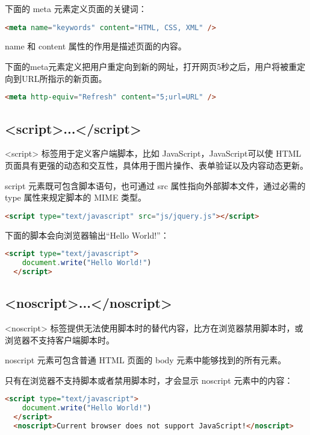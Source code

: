 下面的 meta 元素定义页面的关键词：

\begin{lstlisting}[language=HTML]
  <meta name="keywords" content="HTML, CSS, XML" />
\end{lstlisting}

name 和 content 属性的作用是描述页面的内容。

下面的meta元素定义把用户重定向到新的网址，打开网页5秒之后，用户将被重定向到URL所指示的新页面。

\begin{lstlisting}[language=HTML]
  <meta http-equiv="Refresh" content="5;url=URL" />
\end{lstlisting}


\subsection{<script>...</script>}

<script> 标签用于定义客户端脚本，比如 JavaScript，JavaScript可以使 HTML 页面具有更强的动态和交互性，具体用于图片操作、表单验证以及内容动态更新。

script 元素既可包含脚本语句，也可通过 src 属性指向外部脚本文件，通过必需的 type 属性来规定脚本的 MIME 类型。


\begin{lstlisting}[language=HTML]
  <script type="text/javascript" src="js/jquery.js"></script>
\end{lstlisting}

下面的脚本会向浏览器输出“Hello World!”：

\begin{lstlisting}[language=HTML]
  <script type="text/javascript">
    document.write("Hello World!")
  </script>
\end{lstlisting}

\subsection{<noscript>...</noscript>}

<noscript> 标签提供无法使用脚本时的替代内容，比方在浏览器禁用脚本时，或浏览器不支持客户端脚本时。

noscript 元素可包含普通 HTML 页面的 body 元素中能够找到的所有元素。

只有在浏览器不支持脚本或者禁用脚本时，才会显示 noscript 元素中的内容：

\begin{lstlisting}[language=HTML]
  <script type="text/javascript">
    document.write("Hello World!")
  </script>
  <noscript>Current browser does not support JavaScript!</noscript>
\end{lstlisting}


